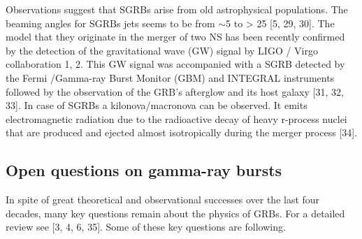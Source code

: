 \documentclass[12pt, a4paper,titlepage]{article}
\numberwithin{equation}{section}
\numberwithin{figure}{section}
\begin{document}
Observations suggest that SGRBs arise from old astrophysical populations. The beaming angles for SGRBs jets seems to be from $\sim$5 to > 25 [5, 29, 30]. The model that they originate in the merger of two NS has been recently confirmed by the detection of the gravitational wave (GW) signal by LIGO / Virgo collaboration 1, 2. This GW signal was accompanied with a SGRB detected by the Fermi /Gamma-ray Burst Monitor (GBM) and INTEGRAL instruments followed by the observation of the GRB’s afterglow and its host galaxy [31, 32, 33]. In case of SGRBs a kilonova/macronova can be observed. It emits electromagnetic radiation due to the radioactive decay of heavy r-process nuclei that are produced and ejected almost isotropically during the merger process [34].

\subsection{Open questions on gamma-ray bursts}

In spite of great theoretical and observational successes over the last four decades, many key questions remain about the physics of GRBs. For a detailed review see [3, 4, 6, 35]. Some of these key questions are following.
\end{document}
